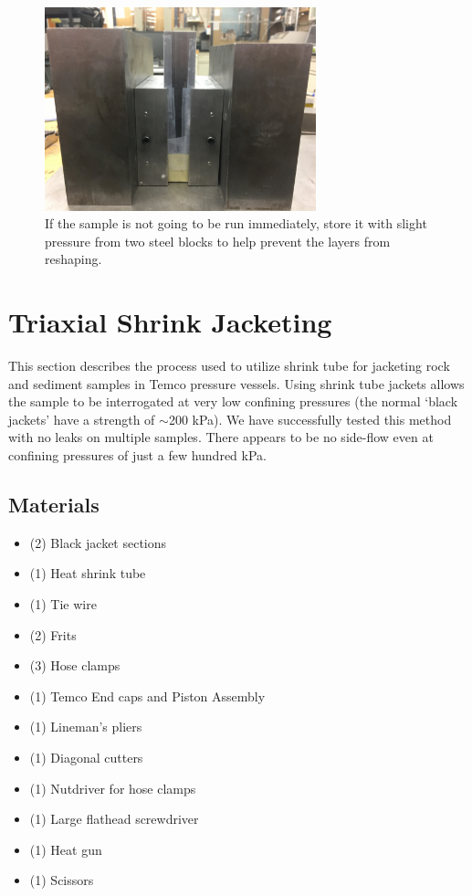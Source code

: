 \begin{figure}
	\centering
        \includegraphics[width=0.7\textwidth]{appendix_sample_prep/dds_store_sample.jpg}
   	\caption{If the sample is not going to be run immediately, store it with slight pressure from two steel blocks to help prevent the layers from reshaping.}
  	\label{Fig:dds_store_sample}
\end{figure}


\clearpage
\section{Triaxial Shrink Jacketing}
This section describes the process used to utilize shrink tube for jacketing rock and sediment samples in Temco pressure vessels.  Using shrink tube jackets allows the sample to be interrogated at very low confining pressures (the normal `black jackets' have a strength of $\sim$200 kPa).  We have successfully tested this method with no leaks on multiple samples.  There appears to be no side-flow even at confining pressures of just a few hundred kPa.  

\subsection{Materials}

\begin{itemize}

\item{(2) Black jacket sections}
\item{(1) Heat shrink tube}
\item{(1) Tie wire}
\item{(2) Frits}
\item{(3) Hose clamps}
\item{(1) Temco End caps and Piston Assembly}
\item{(1) Lineman's pliers}
\item{(1) Diagonal cutters}
\item{(1) Nutdriver for hose clamps}
\item{(1) Large flathead screwdriver}
\item{(1) Heat gun}
\item{(1) Scissors }


\end{itemize}

